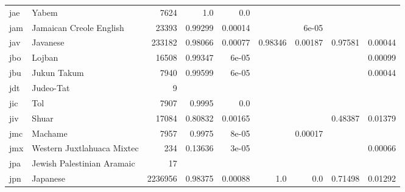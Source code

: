 \documentclass[11pt]{article}
\begin{document}
\begin{table*}[h]
{\begin{tabular}{llrrrrrrr}
jae         & Yabem         & 7624         & 1.0         & 0.0         &          &          &          &          \\

jam         & Jamaican Creole English         & 23393         & 0.99299         & 0.00014         &          & 6e-05         &          &          \\

jav         & Javanese         & 233182         & 0.98066         & 0.00077         & 0.98346         & 0.00187         & 0.97581         & 0.00044         \\

jbo         & Lojban         & 16508         & 0.99347         & 6e-05         &          &          &          & 0.00099         \\

jbu         & Jukun Takum         & 7940         & 0.99599         & 6e-05         &          &          &          & 0.00044         \\

jdt         & Judeo-Tat         & 9         &          &          &          &          &          &          \\

jic         & Tol         & 7907         & 0.9995         & 0.0         &          &          &          &          \\

jiv         & Shuar         & 17084         & 0.80832         & 0.00165         &          &          & 0.48387         & 0.01379         \\

jmc         & Machame         & 7957         & 0.9975         & 8e-05         &          & 0.00017         &          &          \\

jmx         & Western Juxtlahuaca Mixtec         & 234         & 0.13636         & 3e-05         &          &          &          & 0.00066         \\

jpa         & Jewish Palestinian Aramaic         & 17         &          &          &          &          &          &          \\

jpn         & Japanese         & 2236956         & 0.98375         & 0.00088         & 1.0         & 0.0         & 0.71498         & 0.01292         \\


\end{tabular}}
\end{table*}
\end{document}
